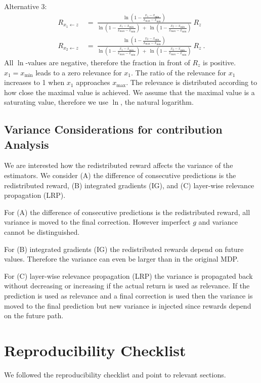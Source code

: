 \documentclass{article}
\begin{document}
\begin{appendices}
Alternative 3:
\begin{align}
  R_{x_1 \leftarrow z}   \ &= \
  \frac{\ln\left(1-\frac{x_1-x_{\min}}{x_{\max}-x_{\min}} \right)}{\ln\left(1-\frac{x_1-x_{\min}}{x_{\max}-x_{\min}} \right) \ + \ \ln\left(1-\frac{x_2-x_{\min}}{x_{\max}-x_{\min}} \right)} \ R_z \\
  R_{x_2 \leftarrow z}   \ &= \
  \frac{\ln\left(1-\frac{x_2-x_{\min}}{x_{\max}-x_{\min}} \right)}{\ln\left(1-\frac{x_1-x_{\min}}{x_{\max}-x_{\min}} \right) \ + \ \ln\left(1-\frac{x_2-x_{\min}}{x_{\max}-x_{\min}} \right)} \ R_z  \ .
\end{align}
All $\ln$-values are negative, therefore the fraction in front of
$R_z$ is positive. $x_1= x_{\min}$ leads to a zero relevance for $x_1$.
The ratio of the relevance for $x_1$
increases to 1 when $x_1$ approaches $x_{\max}$. 
The relevance is distributed according to how close the maximal value
is achieved. We assume that the maximal value is a saturating value,
therefore we use $\ln$, the natural logarithm.



\subsection{Variance Considerations for contribution Analysis}

We are interested how the redistributed reward affects the variance 
of the estimators. 
We consider
(A) the difference of consecutive predictions is the redistributed reward,
(B) integrated gradients (IG), and
(C) layer-wise relevance propagation (LRP).

For (A) the difference of consecutive predictions is the redistributed reward,
all variance is moved to the final correction. However imperfect $g$ and variance
cannot be distinguished.

For (B) integrated gradients (IG) the redistributed rewards depend on future values.
Therefore the variance can even be larger than in the original MDP.

For (C) layer-wise relevance propagation (LRP) the variance is propagated back without
decreasing or increasing if the actual return is used as relevance. If the prediction is
used as relevance and a final correction is used then the variance is moved to the final
prediction but new variance is injected since rewards depend on the future path.



\clearpage
\pagebreak
\section{Reproducibility Checklist}
We followed the reproducibility checklist \cite{Pineau:18} and point to relevant sections. 

\end{appendices}
\end{document}
